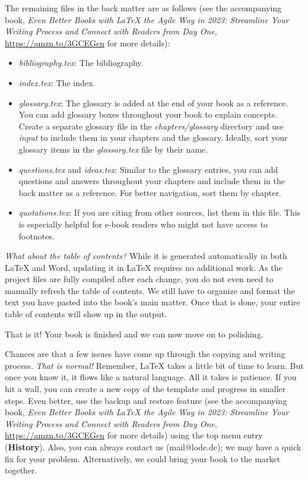 The remaining files in the back matter are as follows (see the accompanying book, \textit{Even Better Books with LaTeX the Agile Way in 2023: Streamline Your Writing Process and Connect with Readers from Day One}, \url{https://amzn.to/3GCEGen} for more details):

\begin{itemize}
    \item \textit{bibliography.tex}: The bibliography.
    \item \textit{index.tex}: The index.
    \item \textit{glossary.tex}: The glossary is added at the end of your book as a reference. You can add glossary boxes throughout your book to explain concepts. Create a separate glossary file in the \textit{chapters/glossary} directory and use \textit{input} to include them in your chapters and the glossary. Ideally, sort your glossary items in the \textit{glossary.tex} file by their name.
    \item \textit{questions.tex} and \textit{ideas.tex}: Similar to the glossary entries, you can add questions and answers throughout your chapters and include them in the back matter as a reference. For better navigation, sort them by chapter.
    \item \textit{quotations.tex}: If you are citing from other sources, list them in this file. This is especially helpful for e-book readers who might not have access to footnotes.
\end{itemize}


\textit{What about the table of contents?} While it is generated automatically in both LaTeX and Word, updating it in LaTeX requires no additional work. As the project files are fully compiled after each change, you do not even need to manually refresh the table of contents. We still have to organize and format the text you have pasted into the book's main matter. Once that is done, your entire table of contents will show up in the output.

That is it! Your book is finished and we can now move on to polishing. 

Chances are that a few issues have come up through the copying and writing process. \textit{That is normal!} Remember, LaTeX takes a little bit of time to learn. But once you know it, it flows like a natural language. All it takes is patience. If you hit a wall, you can create a new copy of the template and progress in smaller steps. Even better, use the backup and restore feature (see the accompanying book, \textit{Even Better Books with LaTeX the Agile Way in 2023: Streamline Your Writing Process and Connect with Readers from Day One}, \url{https://amzn.to/3GCEGen} for more details) using the top menu entry (\textbf{History}). Also, you can always contact us (mail@lode.de); we may have a quick fix for your problem. Alternatively, we could bring your book to the market together.

